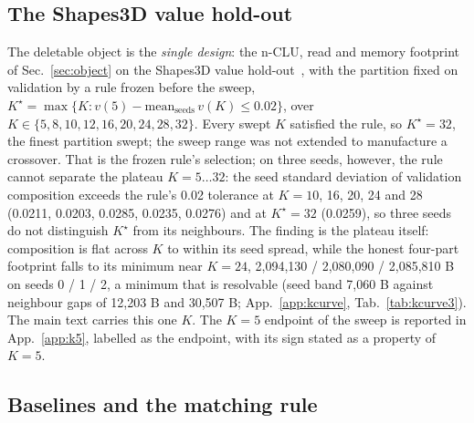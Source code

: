 \documentclass{article} %
\newcommand{\Kstar}{\ensuremath{K^{\star}}}
\begin{document}
\subsection{The Shapes3D value hold-out}
\label{sec:shapes}

The deletable object is the \emph{single design}: the n-CLU, read and memory footprint of
Sec.~\ref{sec:object} on the Shapes3D value hold-out~\citep{montero2021role,schott_visual_2022}, with the partition fixed on validation
by a rule frozen before the sweep, $\Kstar=\max\{K : v(5)-\text{mean}_{\text{seeds}}\,v(K)\le
0.02\}$, over $K\in\{5,8,10,12,16,20,24,28,32\}$. Every swept $K$ satisfied the rule, so
$\Kstar=32$, the finest partition swept; the sweep range was not extended to manufacture a
crossover. %
That is the frozen rule's selection; on three seeds, however, the rule cannot separate the plateau
$K=5\ldots32$: the seed standard deviation of validation composition exceeds the rule's 0.02
tolerance at $K=10$, 16, 20, 24 and 28 (0.0211, 0.0203, 0.0285, 0.0235, 0.0276) and at $\Kstar=32$ %
(0.0259), so three seeds do not distinguish $\Kstar$ from its neighbours. %
The finding is the plateau itself: composition is flat across $K$ to within its seed spread, while
the honest four-part footprint falls to its minimum near $K=24$, 2,094,130 / 2,080,090 / 2,085,810 B %
on seeds 0 / 1 / 2, a minimum that is resolvable (seed band 7,060 B against neighbour gaps of %
12,203 B and 30,507 B; App.~\ref{app:kcurve}, Tab.~\ref{tab:kcurve3}). %
The main text carries this one $K$. The $K=5$ endpoint of the sweep is reported in
App.~\ref{app:k5}, labelled as the endpoint, with its sign stated as a property of $K=5$.

\subsection{Baselines and the matching rule}
\end{document}
